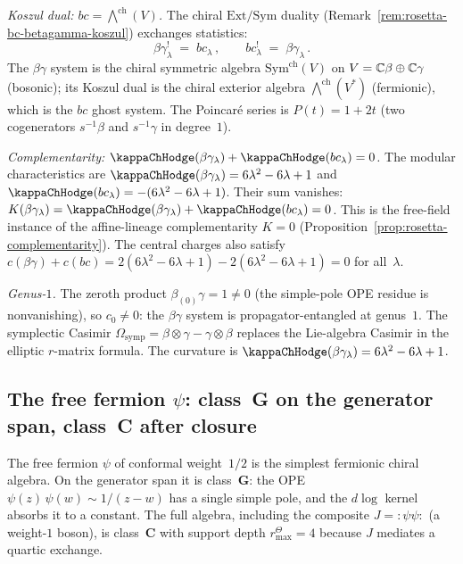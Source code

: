 \begin{computation}
\smallskip
\noindent
\emph{Koszul dual: $bc = \bigwedge^{\mathrm{ch}}(V)$.}
The chiral $\mathrm{Ext}/\mathrm{Sym}$ duality
(Remark~\ref{rem:rosetta-bc-betagamma-koszul})
exchanges statistics:
\begin{equation}\label{eq:betagamma-koszul-dual}
\beta\gamma_\lambda^!
\;=\;
bc_\lambda\,,
\qquad
bc_\lambda^!
\;=\;
\beta\gamma_\lambda\,.
\end{equation}
The $\beta\gamma$ system is the chiral symmetric algebra
$\mathrm{Sym}^{\mathrm{ch}}(V)$
on $V = \mathbb{C}\beta \oplus \mathbb{C}\gamma$ (bosonic); its
Koszul dual is the chiral exterior algebra
$\bigwedge^{\mathrm{ch}}(V^*)$ (fermionic), which is the
$bc$ ghost system.
The Poincar\'{e} series is $P(t) = 1 + 2t$
(two cogenerators $s^{-1}\beta$ and $s^{-1}\gamma$
in degree~$1$).

\smallskip
\noindent
\emph{Complementarity: $\kappaChHodge(\beta\gamma_\lambda) + \kappaChHodge(bc_\lambda) = 0$.}
The modular characteristics are
$\kappaChHodge(\beta\gamma_\lambda) = 6\lambda^2 - 6\lambda + 1$ and
$\kappaChHodge(bc_\lambda) = -(6\lambda^2 - 6\lambda + 1)$.
Their sum vanishes:
$K(\beta\gamma_\lambda) = \kappaChHodge(\beta\gamma_\lambda) + \kappaChHodge(bc_\lambda) = 0$.
This is the free-field instance of the affine-lineage
complementarity $K = 0$
(Proposition~\ref{prop:rosetta-complementarity}).
The central charges also satisfy
$c(\beta\gamma) + c(bc)
= 2(6\lambda^2 - 6\lambda + 1) - 2(6\lambda^2 - 6\lambda + 1) = 0$
for all~$\lambda$.

\smallskip
\noindent
\emph{Genus-$1$.}
The zeroth product $\beta_{(0)}\gamma = 1 \ne 0$ (the simple-pole OPE residue is nonvanishing), so $c_0 \ne 0$: the $\beta\gamma$ system is propagator-entangled at genus~$1$.
The symplectic Casimir $\Omega_{\mathrm{symp}}
= \beta \otimes \gamma - \gamma \otimes \beta$
replaces the Lie-algebra Casimir in the elliptic
$r$-matrix formula. The curvature is
$\kappaChHodge(\beta\gamma_\lambda) = 6\lambda^2 - 6\lambda + 1$.
\end{computation}

\subsection{The free fermion $\psi$: class~G on the generator span, class~C after closure}%
\label{subsec:free-fermion-ordered-bar}%
%

The free fermion $\psi$ of conformal weight~$1/2$ is the
simplest fermionic chiral algebra. On the generator span it is
class~$\mathbf{G}$: the OPE $\psi(z)\,\psi(w) \sim 1/(z-w)$
has a single simple pole, and the $d\log$ kernel absorbs it
to a constant. The full algebra, including the composite
$J = {:}\psi\psi{:}$ (a weight-$1$ boson), is class~$\mathbf{C}$
with support depth $r^\Theta_{\max}=4$ because $J$ mediates a quartic
exchange.

